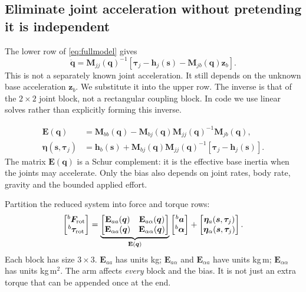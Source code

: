 \documentclass[11pt,a4paper]{article}
\newcommand{\vct}[1]{\boldsymbol{#1}}
\newcommand{\mat}[1]{\mathbf{#1}}
\newcommand{\bv}[1]{{}^{b}\vct{#1}}
\begin{document}
\subsection{Eliminate joint acceleration without pretending it is independent}
The lower row of \eqref{eq:fullmodel} gives
\begin{equation}
\ddot{\vct q}=\mat M_{jj}(\vct q)^{-1}
\left[\vct\tau_j-\vct h_j(\vct s)-\mat M_{jb}(\vct q)\vct z_b\right].
\label{eq:ddq}
\end{equation}
This is not a separately known joint acceleration. It still depends on the
unknown base acceleration $\vct z_b$. We substitute it into the upper row.
The inverse is that of the $2\times2$ joint block, not a rectangular coupling block.
In code we use linear solves rather than explicitly forming this inverse.

\begin{equation}
\begin{aligned}
\mat E(\vct q)&=\mat M_{bb}(\vct q)
-\mat M_{bj}(\vct q)\mat M_{jj}(\vct q)^{-1}\mat M_{jb}(\vct q),\\
\vct\eta(\vct s,\vct\tau_j)&=\vct h_b(\vct s)
+\mat M_{bj}(\vct q)\mat M_{jj}(\vct q)^{-1}
\left[\vct\tau_j-\vct h_j(\vct s)\right].
\end{aligned}\label{eq:reduceddefinitions}
\end{equation}
The matrix $\mat E(\vct q)$ is a Schur complement: it is the effective base
inertia when the joints may accelerate. Only the bias also depends on joint
rates, body rate, gravity and the bounded applied effort.

Partition the reduced system into force and torque rows:
\begin{equation}
\begin{bmatrix}\bv F_{\rm rot}\\\bv\tau_{\rm rot}\end{bmatrix}
=\underbrace{\begin{bmatrix}
\mat E_{aa}(\vct q)&\mat E_{a\alpha}(\vct q)\\
\mat E_{\alpha a}(\vct q)&\mat E_{\alpha\alpha}(\vct q)
\end{bmatrix}}_{\mat E(\vct q)}
\begin{bmatrix}\bv a\\\bv\alpha\end{bmatrix}
+\begin{bmatrix}\vct\eta_a(\vct s,\vct\tau_j)\\
\vct\eta_\alpha(\vct s,\vct\tau_j)\end{bmatrix}.
\label{eq:reduced}
\end{equation}
Each block has size $3\times3$.
$\mat E_{aa}$ has units kg; $\mat E_{a\alpha}$ and $\mat E_{\alpha a}$ have
units kg\,m; $\mat E_{\alpha\alpha}$ has units kg\,m$^2$.
The arm affects \emph{every} block and the bias. It is not just an extra torque
that can be appended once at the end.
\end{document}
